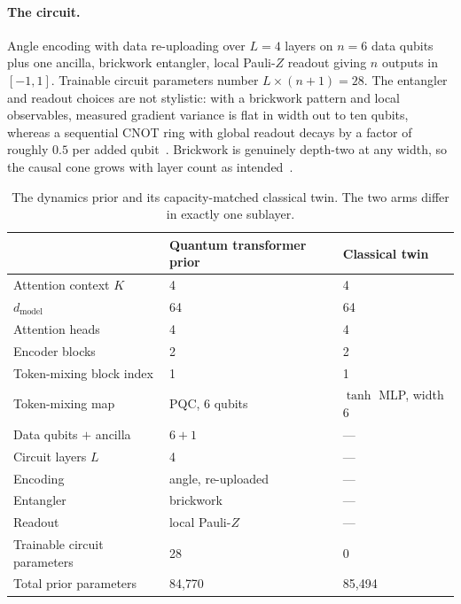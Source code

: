 \documentclass[11pt,onecolumn]{article}
\begin{document}
\paragraph{The circuit.}
Angle encoding with data re-uploading over $L = 4$ layers on
$n = 6$ data qubits plus one ancilla, brickwork entangler, local
Pauli-$Z$ readout giving $n$ outputs in $[-1, 1]$. Trainable circuit
parameters number $L \times (n+1) = 28$. The entangler and readout
choices are not stylistic: with a brickwork pattern and local
observables, measured gradient variance is flat in width out to ten
qubits, whereas a sequential CNOT ring with global readout decays by a
factor of roughly $0.5$ per added qubit~\cite{papera}. Brickwork is
genuinely depth-two at any width, so the causal cone grows with layer
count as intended~\cite{cerezo2021}.

\begin{table}[htb]\centering\small
\caption{The dynamics prior and its capacity-matched classical twin.
The two arms differ in exactly one sublayer.}
\label{tab:arch}
\begin{tabular}{lll}
\toprule
& Quantum transformer prior & Classical twin \\
\midrule
Attention context $K$          & 4                  & 4 \\
$d_{\mathrm{model}}$           & 64                 & 64 \\
Attention heads                & 4                  & 4 \\
Encoder blocks                 & 2                  & 2 \\
Token-mixing block index       & 1                  & 1 \\
Token-mixing map               & PQC, 6 qubits      & $\tanh$ MLP, width 6 \\
Data qubits $+$ ancilla        & $6 + 1$            & --- \\
Circuit layers $L$             & 4                  & --- \\
Encoding                       & angle, re-uploaded & --- \\
Entangler                      & brickwork          & --- \\
Readout                        & local Pauli-$Z$    & --- \\
\midrule
Trainable circuit parameters   & 28                 & 0 \\
Total prior parameters         & 84{,}770           & 85{,}494 \\
\bottomrule
\end{tabular}
\end{table}
\end{document}
